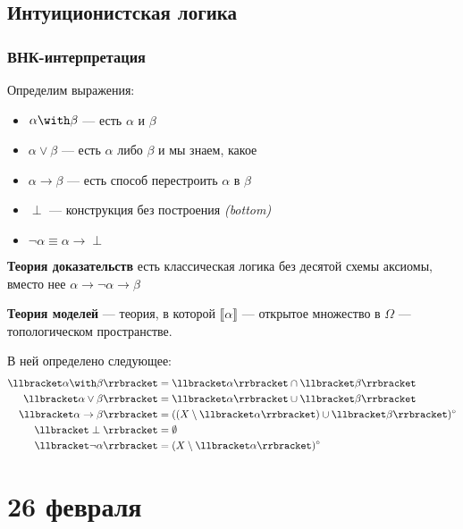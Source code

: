 \section{Интуиционистская логика}

\subsection{ВНК-интерпретация}

Определим выражения:
\begin{itemize}
    \item \(\alpha \with \beta\) --- есть \(\alpha\) и \(\beta\)
    \item \(\alpha \lor \beta\) --- есть \(\alpha\) либо \(\beta\) и мы знаем, какое
    \item \(\alpha \to \beta\) --- есть способ перестроить \(\alpha\) в \(\beta\)
    \item \(\perp\) --- конструкция без построения \textit{(bottom)}
    \item \(\neg \alpha \equiv \alpha \to \perp\)
\end{itemize}

\textbf{Теория доказательств} есть классическая логика без десятой схемы аксиомы, вместо нее \(\alpha \to \neg \alpha \to \beta\)

\textbf{Теория моделей} --- теория, в которой \(\llbracket \alpha \rrbracket\) --- открытое множество в \(\Omega\) --- топологическом пространстве.

В ней определено следующее:
\begin{align*}
    \llbracket \alpha \with \beta \rrbracket & = \llbracket \alpha \rrbracket \cap \llbracket \beta \rrbracket                       \\
    \llbracket \alpha \lor \beta \rrbracket  & = \llbracket \alpha \rrbracket \cup \llbracket \beta \rrbracket                       \\
    \llbracket \alpha \to \beta \rrbracket   & = ((X \setminus \llbracket \alpha \rrbracket) \cup \llbracket \beta \rrbracket)^\circ \\
    \llbracket \perp \rrbracket              & = \emptyset                                                                           \\
    \llbracket \neg \alpha \rrbracket        & = (X \setminus \llbracket \alpha\rrbracket)^\circ
\end{align*}

\chapter{26 февраля}

